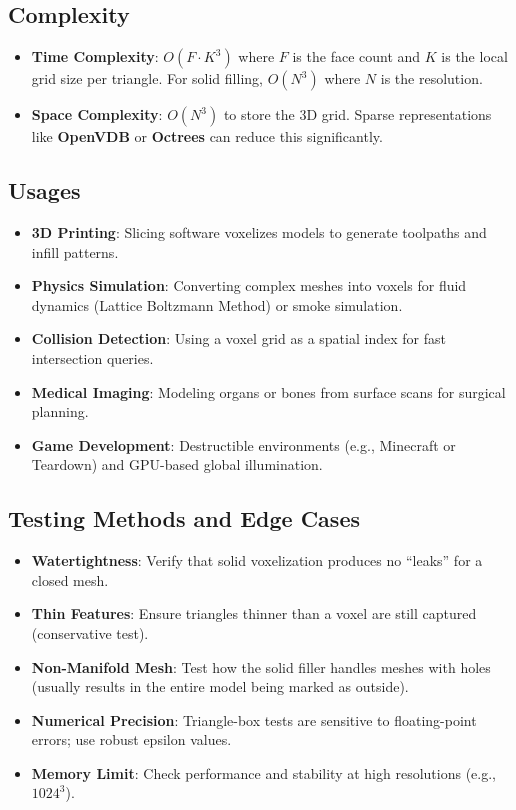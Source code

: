 \subsection{Complexity}
\begin{itemize}
\item \textbf{Time Complexity}: $O(F \cdot K^3)$ where $F$ is the face count and $K$ is the local grid size per triangle. For solid filling, $O(N^3)$ where $N$ is the resolution.
\item \textbf{Space Complexity}: $O(N^3)$ to store the 3D grid. Sparse representations like \textbf{OpenVDB} or \textbf{Octrees} can reduce this significantly.
\end{itemize}

\subsection{Usages}
\begin{itemize}
\item \textbf{3D Printing}: Slicing software voxelizes models to generate toolpaths and infill patterns.
\item \textbf{Physics Simulation}: Converting complex meshes into voxels for fluid dynamics (Lattice Boltzmann Method) or smoke simulation.
\item \textbf{Collision Detection}: Using a voxel grid as a spatial index for fast intersection queries.
\item \textbf{Medical Imaging}: Modeling organs or bones from surface scans for surgical planning.
\item \textbf{Game Development}: Destructible environments (e.g., Minecraft or Teardown) and GPU-based global illumination.
\end{itemize}

\subsection{Testing Methods and Edge Cases}
\begin{itemize}
\item \textbf{Watertightness}: Verify that solid voxelization produces no ``leaks'' for a closed mesh.
\item \textbf{Thin Features}: Ensure triangles thinner than a voxel are still captured (conservative test).
\item \textbf{Non-Manifold Mesh}: Test how the solid filler handles meshes with holes (usually results in the entire model being marked as outside).
\item \textbf{Numerical Precision}: Triangle-box tests are sensitive to floating-point errors; use robust epsilon values.
\item \textbf{Memory Limit}: Check performance and stability at high resolutions (e.g., $1024^3$).
\end{itemize}


